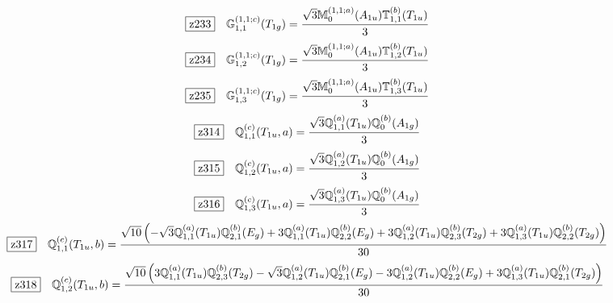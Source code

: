 \documentclass[fleqn,10pt,landscape]{jsarticle}
\begin{document}
\begin{dmath*}
\hspace*{3mm}\fbox{z233}\quad \mathbb{G}_{1,1}^{(1,1;c)}(T_{1g})=\frac{\sqrt{3} \mathbb{M}_{0}^{(1,1;a)}(A_{1u}) \mathbb{T}_{1,1}^{(b)}(T_{1u})}{3}
\end{dmath*}
\begin{dmath*}
\hspace*{3mm}\fbox{z234}\quad \mathbb{G}_{1,2}^{(1,1;c)}(T_{1g})=\frac{\sqrt{3} \mathbb{M}_{0}^{(1,1;a)}(A_{1u}) \mathbb{T}_{1,2}^{(b)}(T_{1u})}{3}
\end{dmath*}
\begin{dmath*}
\hspace*{3mm}\fbox{z235}\quad \mathbb{G}_{1,3}^{(1,1;c)}(T_{1g})=\frac{\sqrt{3} \mathbb{M}_{0}^{(1,1;a)}(A_{1u}) \mathbb{T}_{1,3}^{(b)}(T_{1u})}{3}
\end{dmath*}
\begin{dmath*}
\hspace*{3mm}\fbox{z314}\quad \mathbb{Q}_{1,1}^{(c)}(T_{1u},a)=\frac{\sqrt{3} \mathbb{Q}_{1,1}^{(a)}(T_{1u}) \mathbb{Q}_{0}^{(b)}(A_{1g})}{3}
\end{dmath*}
\begin{dmath*}
\hspace*{3mm}\fbox{z315}\quad \mathbb{Q}_{1,2}^{(c)}(T_{1u},a)=\frac{\sqrt{3} \mathbb{Q}_{1,2}^{(a)}(T_{1u}) \mathbb{Q}_{0}^{(b)}(A_{1g})}{3}
\end{dmath*}
\begin{dmath*}
\hspace*{3mm}\fbox{z316}\quad \mathbb{Q}_{1,3}^{(c)}(T_{1u},a)=\frac{\sqrt{3} \mathbb{Q}_{1,3}^{(a)}(T_{1u}) \mathbb{Q}_{0}^{(b)}(A_{1g})}{3}
\end{dmath*}
\begin{dmath*}
\hspace*{3mm}\fbox{z317}\quad \mathbb{Q}_{1,1}^{(c)}(T_{1u},b)=\frac{\sqrt{10} \left(- \sqrt{3} \mathbb{Q}_{1,1}^{(a)}(T_{1u}) \mathbb{Q}_{2,1}^{(b)}(E_{g}) + 3 \mathbb{Q}_{1,1}^{(a)}(T_{1u}) \mathbb{Q}_{2,2}^{(b)}(E_{g}) + 3 \mathbb{Q}_{1,2}^{(a)}(T_{1u}) \mathbb{Q}_{2,3}^{(b)}(T_{2g}) + 3 \mathbb{Q}_{1,3}^{(a)}(T_{1u}) \mathbb{Q}_{2,2}^{(b)}(T_{2g})\right)}{30}
\end{dmath*}
\begin{dmath*}
\hspace*{3mm}\fbox{z318}\quad \mathbb{Q}_{1,2}^{(c)}(T_{1u},b)=\frac{\sqrt{10} \left(3 \mathbb{Q}_{1,1}^{(a)}(T_{1u}) \mathbb{Q}_{2,3}^{(b)}(T_{2g}) - \sqrt{3} \mathbb{Q}_{1,2}^{(a)}(T_{1u}) \mathbb{Q}_{2,1}^{(b)}(E_{g}) - 3 \mathbb{Q}_{1,2}^{(a)}(T_{1u}) \mathbb{Q}_{2,2}^{(b)}(E_{g}) + 3 \mathbb{Q}_{1,3}^{(a)}(T_{1u}) \mathbb{Q}_{2,1}^{(b)}(T_{2g})\right)}{30}
\end{dmath*}
\end{document}
